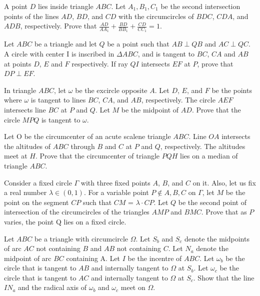 \documentclass{scrartcl}
\begin{document}
\begin{problem}
A point $D$ lies inside triangle $ABC$. Let $A_1, B_1, C_1$ be the second intersection points of the lines $AD$, $BD$, and $CD$ with the circumcircles of $BDC$, $CDA$, and $ADB$, respectively. Prove that
$\frac{AD}{AA_1} + \frac{BD}{BB_1}  + \frac{CD}{CC_1} = 1.$
\end{problem}
\begin{problem}
Let $ABC$ be a triangle and let $Q$ be a point such that $AB \perp QB$ and $AC \perp QC$. A circle with center I is inscribed in $\Delta ABC$, and is tangent to $BC$, $CA$ and $AB$ at points $D$, $E$ and $F$ respectively. If ray $QI$ intersects $EF$ at $P$, prove that $DP \perp EF$. 
\end{problem}
\begin{problem}
In triangle $ABC$, let $\omega$ be the excircle opposite $A$. Let $D$, $E$, and $F$ be the points where $\omega$ is tangent to lines $BC$, $CA$, and $AB$, respectively. The circle $AEF$ intersects line $BC$ at $P$ and $Q$. Let $M$ be the midpoint of $AD$. Prove that the circle $MPQ$ is tangent to $\omega$. 
\end{problem}
\begin{problem}
Let O be the circumcenter of an acute scalene triangle $ABC$. Line $OA$ intersects the altitudes of $ABC$ through $B$ and $C$ at $P$ and $Q$, respectively. The altitudes meet at $H$. Prove that the circumcenter of triangle $PQH$ lies on a median of triangle $ABC$. 
\end{problem}
\begin{problem}
Consider a fixed circle $\Gamma$ with three fixed points $A$, $B$, and $C$ on it. Also, let us fix a real number $\lambda \in (0, 1)$. For a variable point $P \notin {A, B, C}$ on $\Gamma$, let $M$ be the point on the segment $CP$ such that $CM$ = $\lambda \cdot CP$. Let $Q$ be the second point of intersection of the circumcircles of the triangles $AMP$ and $BMC$. Prove that as $P$ varies, the point Q lies on a fixed circle. 
\end{problem}
\begin{problem} Let $ABC$ be a triangle with circumcircle $\Omega$. Let $S_b$ and $S_c$ denote the midpoints of arc $AC$ not containing $B$ and $AB$ not containing $C$. Let $N_a$ denote the midpoint of arc $BC$ containing A. Let $I$ be the incentre of $ABC$. Let $\omega_b$ be the circle that is tangent to $AB$ and internally tangent to $\Omega$ at $S_b$. Let $\omega_c$ be the circle that is tangent to $AC$ and internally tangent to $\Omega$ at $S_c$. Show that the line $IN_a$ and the radical axis of $\omega_b$ and $\omega_c$ meet on $\Omega$. 
\end{problem}
\newpage
\end{document}
